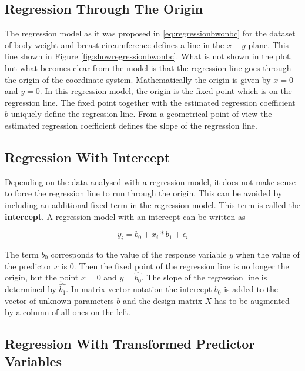 \documentclass[]{book}
\theoremstyle{definition}
\theoremstyle{definition}
\theoremstyle{definition}
\theoremstyle{remark}
\begin{document}
\hypertarget{asm-flem-regression-origin}{%
\subsection{Regression Through The Origin}\label{asm-flem-regression-origin}}

The regression model as it was proposed in \eqref{eq:regressionbwonbc} for the dataset of body weight and breast circumference defines a line in the \(x-y\)-plane. This line shown in Figure \ref{fig:showregressionbwonbc}. What is not shown in the plot, but what becomes clear from the model is that the regression line goes through the origin of the coordinate system. Mathematically the origin is given by \(x=0\) and \(y=0\). In this regression model, the origin is the fixed point which is on the regression line. The fixed point together with the estimated regression coefficient \(\hat{b}\) uniquely define the regression line. From a geometrical point of view the estimated regression coefficient defines the slope of the regression line.

\hypertarget{asm-flem-regression-intercept}{%
\subsection{Regression With Intercept}\label{asm-flem-regression-intercept}}

Depending on the data analysed with a regression model, it does not make sense to force the regression line to run through the origin. This can be avoided by including an additional fixed term in the regression model. This term is called the \textbf{intercept}. A regression model with an intercept can be written as

\begin{equation}
  y_i = b_0 + x_i * b_1 + \epsilon_i
  \label{eq:regressionintercept}
\end{equation}

The term \(b_0\) corresponds to the value of the response variable \(y\) when the value of the predictor \(x\) is \(0\). Then the fixed point of the regression line is no longer the origin, but the point \(x = 0\) and \(y = \widehat{b_0}\). The slope of the regression line is determined by \(\widehat{b_1}\). In matrix-vector notation the intercept \(b_0\) is added to the vector of unknown parameters \(b\) and the design-matrix \(X\) has to be augmented by a column of all ones on the left.

\hypertarget{asm-flem-regression-transformed-predictors}{%
\subsection{Regression With Transformed Predictor Variables}\label{asm-flem-regression-transformed-predictors}}
\end{document}
